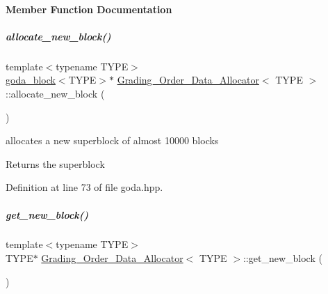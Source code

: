 \paragraph{Member Function Documentation}
\mbox{\label{group__memorygroup_a3ac79e785e392024b24c18d60ff3fc3c}} 
\subparagraph{\texorpdfstring{allocate\+\_\+new\+\_\+block()}{allocate\_new\_block()}}
{\footnotesize\ttfamily template$<$typename T\+Y\+PE$>$ \\
\hyperlink{group__memorygroup_uniongoda__block}{goda\+\_\+block}$<$T\+Y\+PE$>$$\ast$ \hyperlink{group__memorygroup_class_grading___order___data___allocator}{Grading\+\_\+\+Order\+\_\+\+Data\+\_\+\+Allocator}$<$ T\+Y\+PE $>$\+::allocate\+\_\+new\+\_\+block (\begin{DoxyParamCaption}{ }\end{DoxyParamCaption})\hspace{0.3cm}{\ttfamily [inline]}}



allocates a new superblock of almost 10000 blocks 

\begin{DoxyReturn}{Returns}
the superblock 
\end{DoxyReturn}


Definition at line 73 of file goda.\+hpp.

\mbox{\label{group__memorygroup_a699e85282a021fd7b06f65b9e773eb30}} 
\subparagraph{\texorpdfstring{get\+\_\+new\+\_\+block()}{get\_new\_block()}}
{\footnotesize\ttfamily template$<$typename T\+Y\+PE$>$ \\
T\+Y\+PE$\ast$ \hyperlink{group__memorygroup_class_grading___order___data___allocator}{Grading\+\_\+\+Order\+\_\+\+Data\+\_\+\+Allocator}$<$ T\+Y\+PE $>$\+::get\+\_\+new\+\_\+block (\begin{DoxyParamCaption}{ }\end{DoxyParamCaption})\hspace{0.3cm}{\ttfamily [inline]}}



